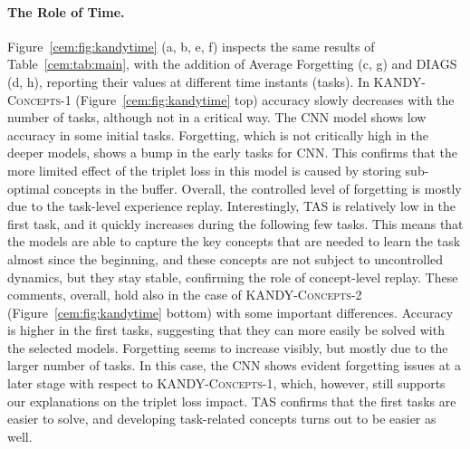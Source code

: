 \paragraph{The Role of Time.} Figure~\ref{cem:fig:kandytime} (a, b, e, f) inspects the same results of Table~\ref{cem:tab:main}, with the addition of {\small\sc Average Forgetting} (c, g) and {\small \sc DIAGS} (d, h), reporting their values at different time instants (tasks). In \textsc{KANDY-Concepts-1} (Figure~\ref{cem:fig:kandytime} top) accuracy slowly decreases with the number of tasks, although not in a critical way. The \textsc{CNN} model shows low accuracy in some initial tasks. Forgetting, which is not critically high in the deeper models, shows a bump in the early tasks for \textsc{CNN}. This confirms that the more limited effect of the triplet loss in this model is caused by storing sub-optimal concepts in the buffer. Overall, the controlled level of forgetting is mostly due to the task-level experience replay. Interestingly, {\small\sc TAS} is relatively low in the first task, and it quickly increases during the following few tasks. This means that the models are able to capture the key concepts that are needed to learn the task almost since the beginning, and these concepts are not subject to uncontrolled dynamics, but they stay stable, confirming the role of concept-level replay.
These comments, overall, hold also in the case of \textsc{KANDY-Concepts-2} (Figure~\ref{cem:fig:kandytime} bottom) with some important differences. Accuracy is higher in the first tasks, suggesting that they can more easily be solved with the selected models. Forgetting seems to increase visibly, but mostly due to the larger number of tasks. In this case, the \textsc{CNN} shows evident forgetting issues at a later stage with respect to \textsc{KANDY-Concepts-1}, which, however, still supports our explanations on the triplet loss impact. {\small\sc TAS} confirms that the first tasks are easier to solve, and developing task-related concepts turns out to be easier as well.
